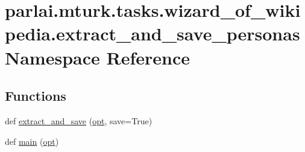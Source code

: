 \hypertarget{namespaceparlai_1_1mturk_1_1tasks_1_1wizard__of__wikipedia_1_1extract__and__save__personas}{}\section{parlai.\+mturk.\+tasks.\+wizard\+\_\+of\+\_\+wikipedia.\+extract\+\_\+and\+\_\+save\+\_\+personas Namespace Reference}
\label{namespaceparlai_1_1mturk_1_1tasks_1_1wizard__of__wikipedia_1_1extract__and__save__personas}
\subsection*{Functions}
\begin{DoxyCompactItemize}
\item 
def \hyperlink{namespaceparlai_1_1mturk_1_1tasks_1_1wizard__of__wikipedia_1_1extract__and__save__personas_afa7facd2483fc5f31f7b87ced91385ad}{extract\+\_\+and\+\_\+save} (\hyperlink{namespaceparlai_1_1mturk_1_1tasks_1_1wizard__of__wikipedia_1_1extract__and__save__personas_af9d0aef8b6fb53e14c74a449cf3c8a63}{opt}, save=True)
\item 
def \hyperlink{namespaceparlai_1_1mturk_1_1tasks_1_1wizard__of__wikipedia_1_1extract__and__save__personas_a8760b04b46dbe7ee79bd15ae3b20761c}{main} (\hyperlink{namespaceparlai_1_1mturk_1_1tasks_1_1wizard__of__wikipedia_1_1extract__and__save__personas_af9d0aef8b6fb53e14c74a449cf3c8a63}{opt})
\end{DoxyCompactItemize}
